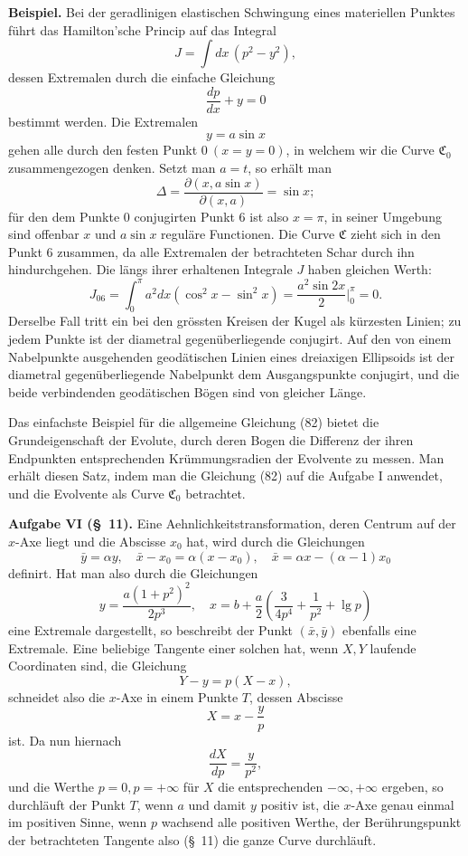 \documentclass[11pt,a4paper,leqno]{article}
\providecommand{\lg}{\operatorname{lg}}
\begin{document}
\noindent\textbf{Beispiel.} Bei der geradlinigen elastischen Schwingung eines materiellen Punktes führt das Hamilton'sche Princip auf das Integral
\[
J=\int dx\,(p^2-y^2),
\]
dessen Extremalen durch die einfache Gleichung
\[
\frac{dp}{dx}+y=0
\]
bestimmt werden. Die Extremalen
\[
y=a\sin x
\]
gehen alle durch den festen Punkt $0\ (x=y=0)$, in welchem wir die Curve $\mathfrak{C}_0$ zusammengezogen denken. Setzt man $a=t$, so erhält man
\[
\Delta=\frac{\partial(x,a\sin x)}{\partial(x,a)}=\sin x;
\]
für den dem Punkte 0 conjugirten Punkt 6 ist also $x=\pi$, in seiner Umgebung sind offenbar $x$ und $a\sin x$ reguläre Functionen. Die Curve $\mathfrak{C}$ zieht sich in den Punkt 6 zusammen, da alle Extremalen
 der betrachteten Schar durch ihn hindurchgehen. Die längs ihrer erhaltenen Integrale $J$ haben gleichen Werth:
\[
J_{06}=\int_0^\pi a^2dx(\cos^2x-\sin^2x)
=\frac{a^2\sin2x}{2}\bigg|_0^\pi=0.
\]
Derselbe Fall tritt ein bei den grössten Kreisen der Kugel als kürzesten Linien; zu jedem Punkte ist der diametral gegenüberliegende conjugirt. Auf den von einem Nabelpunkte ausgehenden geodätischen Linien eines dreiaxigen Ellipsoids ist der diametral gegenüberliegende Nabelpunkt dem Ausgangspunkte conjugirt, und die beide verbindenden geodätischen Bögen sind von gleicher Länge.

Das einfachste Beispiel für die allgemeine Gleichung (82) bietet die Grundeigenschaft der Evolute, durch deren Bogen die Differenz der ihren Endpunkten entsprechenden Krümmungsradien der Evolvente zu messen. Man erhält diesen Satz, indem man die Gleichung (82) auf die Aufgabe I anwendet, und die Evolvente als Curve $\mathfrak{C}_0$ betrachtet.

\noindent\textbf{Aufgabe VI (\S~11).} Eine Aehnlichkeitstransformation, deren Centrum auf der $x$-Axe liegt und die Abscisse $x_0$ hat, wird durch die Gleichungen
\[
\bar y=\alpha y,
\quad
\bar x-x_0=\alpha(x-x_0),
\quad
\bar x=\alpha x-(\alpha-1)x_0
\]
definirt. Hat man also durch die Gleichungen
\[
y=\frac{a(1+p^2)^2}{2p^3},
\quad
x=b+\frac{a}{2}\left(\frac{3}{4p^4}+\frac{1}{p^2}+\lg p\right)
\]
eine Extremale dargestellt, so beschreibt der Punkt $(\bar x,\bar y)$ ebenfalls eine Extremale. Eine beliebige Tangente einer solchen hat, wenn $X,Y$ laufende Coordinaten sind, die Gleichung
\[
Y-y=p(X-x),
\]
schneidet also die $x$-Axe in einem Punkte $T$, dessen Abscisse
\[
X=x-\frac{y}{p}
\]
ist. Da nun hiernach
\[
\frac{dX}{dp}=\frac{y}{p^2},
\]
und die Werthe $p=0,p=+\infty$ für $X$ die entsprechenden $-\infty,+\infty$ ergeben, so durchläuft der Punkt $T$, wenn $a$ und damit $y$ positiv ist, die $x$-Axe genau einmal im positiven Sinne, wenn
$p$ wachsend alle positiven Werthe, der Berührungspunkt der betrachteten Tangente also (\S~11) die ganze Curve durchläuft.
\end{document}
